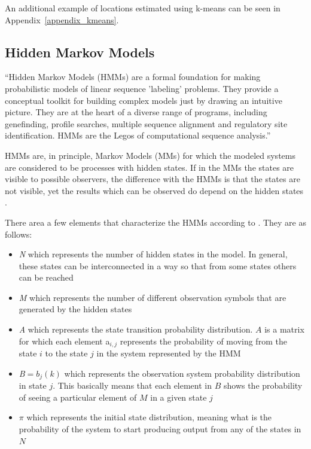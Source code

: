 An additional example of locations estimated using
k-means can be seen in Appendix~\ref{appendix_kmeans}.

\subsection{Hidden Markov Models}
\label{hmm_section}

``Hidden Markov Models (HMMs) are a formal foundation for making probabilistic
models of linear sequence 'labeling' problems. They provide a conceptual
toolkit for building complex models just by drawing an intuitive picture. They
are at the heart of a diverse range of programs, including genefinding, profile
searches, multiple sequence alignment and regulatory site identification. HMMs
are the Legos of computational sequence analysis.''\cite{JOUR} 

HMMs are, in principle, Markov Models (MMs) \cite{opac-b1082850} for which the
modeled systems are considered to be processes with hidden states. If in the
MMs the states are visible to possible observers, the difference with the HMMs
is that the states are not visible, yet the results which can be observed do depend
on the hidden states \cite{18626}.

There area a few elements that characterize the HMMs according to \cite{18626}.
They are as follows:
\begin{itemize}
  \item \textit{N} which represents the number of hidden states in the model. In
  general, these states can be interconnected in a way so that from some states others
  can be reached
  \item \textit{M} which represents the number of different observation symbols
  that are generated by the hidden states
  \item \textit{A} which represents the state transition probability
  distribution. $A$ is a matrix for which each element a$_{i,j}$ represents the
  probability of moving from the state $i$ to the state $j$ in the system
  represented by the HMM
  \item \textit{B}$ = {b_{j}(k)}$ which represents the observation system probability
  distribution in state $j$. This basically means that each element in $B$ shows
  the probability of seeing a particular element of $M$ in a given state $j$
  \item $\pi$ which represents the initial state distribution, meaning what is
  the probability of the system to start producing output from any of the states in
  $N$
\end{itemize}

